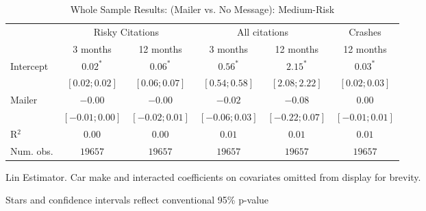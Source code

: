
\begin{table}
\caption{Whole Sample Results: (Mailer vs. No Message): Medium-Risk}
\begin{center}
\begin{threeparttable}
\begin{tabular}{l c c c c c}
\hline
 & \multicolumn{2}{c}{Risky Citations} & \multicolumn{2}{c}{All citations} & \multicolumn{1}{c}{Crashes} \\
\cline{2-3} \cline{4-5} \cline{6-6}
 & 3 months & 12 months & 3 months & 12 months & 12 months \\
\hline
Intercept & $0.02^{*}$       & $0.06^{*}$       & $0.56^{*}$       & $2.15^{*}$       & $0.03^{*}$       \\
          & $ [ 0.02; 0.02]$ & $ [ 0.06; 0.07]$ & $ [ 0.54; 0.58]$ & $ [ 2.08; 2.22]$ & $ [ 0.02; 0.03]$ \\
Mailer    & $-0.00$          & $-0.00$          & $-0.02$          & $-0.08$          & $0.00$           \\
          & $ [-0.01; 0.00]$ & $ [-0.02; 0.01]$ & $ [-0.06; 0.03]$ & $ [-0.22; 0.07]$ & $ [-0.01; 0.01]$ \\
\hline
R$^2$     & $0.00$           & $0.00$           & $0.01$           & $0.01$           & $0.01$           \\
Num. obs. & $19657$          & $19657$          & $19657$          & $19657$          & $19657$          \\
\hline
\end{tabular}
\begin{tablenotes}[flushleft]
\scriptsize{\item Lin Estimator. Car make and interacted coefficients on covariates omitted from display for brevity.
                             \item Stars and confidence intervals reflect conventional 95\% p-value}
\end{tablenotes}
\end{threeparttable}
\label{table:coefficients}
\end{center}
\end{table}
